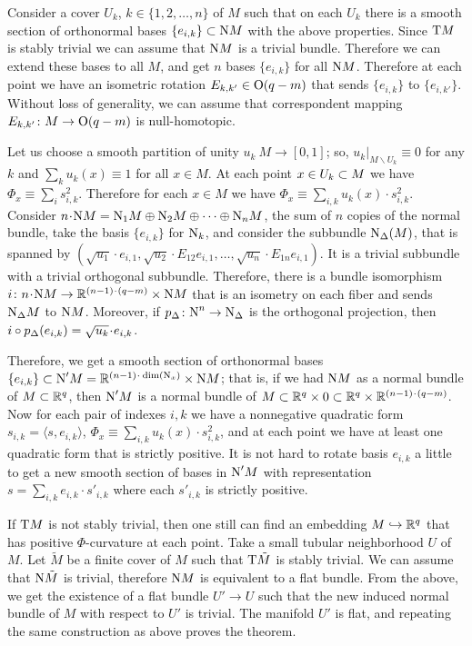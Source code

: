 \documentclass{article}
\begin{document}
Consider a cover $U_k$, $k\in \{1,2,\dots,n\}$
of $M$ such that on each $U_k$ there is a smooth section of
orthonormal bases $\{e_{i,k}\}\subset \text{\rm N} M$ with the above properties.
Since $\text{\rm T} M$ is stably trivial we can assume that $\text{\rm N} M$ is a trivial bundle.
Therefore we
can extend these bases to all $M$, and get $n$ bases
$\{e_{i,k}\}$ for all $\text{\rm N} M$.
Therefore at each point we have an isometric rotation $E_{k,k'}\in \text{\rm O}(q-m)$
that sends $\{e_{i,k}\}$ to $\{e_{i,k'}\}$.
Without loss of generality, we can assume that correspondent mapping
$E_{k,k'}\colon M\to \text{\rm O}(q-m)$ is null-homotopic.

Let us choose a smooth partition of unity $u_k\:M\to [0,1]$; so,
$u_k|_{M\backslash U_k}\equiv 0$  for any $k$ and
$\sum_k u_k(x)\equiv 1$ for all $x\in M$.
At each point $x\in U_k\subset M$ we have
$\Phi_x\equiv \sum_i s_{i,k}^2$.
Therefore for each $x\in M$ we have
$\Phi_x\equiv \sum_{i,k} u_k(x)\cdot  s_{i,k}^2$.
Consider $n\cdot\N M=\N_1 M\oplus \N_2 M\oplus \dots\oplus \N_n M$,
the sum of $n$ copies of the normal bundle,
take the basis $\{e_{i,k}\}$ for $\text{\rm N}_k$, and consider the subbundle $\text{\rm N}_\Delta(M)$,
that is spanned by
$(\sqrt{u_1} \cdot e_{i,1}, \sqrt{u_2} \cdot E_{12}e_{i,1},\dots, \sqrt{u_n} \cdot E_{1n}e_{i,1})$.
It is a trivial subbundle with a trivial orthogonal subbundle.
Therefore, there is a bundle isomorphism $i\:n\cdot \N M\z\to \RR^{(n-1)\cdot (q-m)}\times \N M$ that is an isometry on each fiber and sends
$\text{\rm N}_\Delta M$ to $\text{\rm N} M$.
Moreover, if $p_\Delta\colon\text{\rm N}^n\to \text{\rm N}_\Delta$ is the orthogonal projection, then $i\circ p_\Delta (e_{i,k})\z=\sqrt{u_k} \cdot e_{i,k}$.

Therefore, we get a smooth section of orthonormal bases
$\{e_{i,k}\}\i \N'M\z=\RR^{(n-1)\cdot \dim(\N_x)}\times \N  M$;
that is, if we had $\text{\rm N} M$ as a normal bundle of $M\subset \mathbb{R}^{q}$, then $\text{\rm N}'M$ is a
normal bundle of $M\i \RR^{q}\times 0\i \RR^{q}\times
\RR^{(n-1)\cdot (q-m)}$.
Now for each pair of indexes $i,k$ we have a nonnegative quadratic form $s_{i,k}= \langle s,e_{i,k}\rangle$, $\Phi_x\equiv \sum_{i,k} u_k(x)\cdot s_{i,k}^2$, and at each point we have at least one quadratic form that is strictly positive.
It is not hard to rotate basis $e_{i,k}$ a little to get a new smooth section of bases in $\text{\rm N}'M$ with representation $s= \sum_{i,k}e_{i,k}\cdot s'_{i,k}$ where each $s'_{i,k}$ is strictly positive.

If $\text{\rm T} M$ is not stably trivial, then one still can find an embedding $M\hookrightarrow \mathbb{R}^q$
that has positive $\Phi$-curvature at each point.
Take a small tubular neighborhood $U$ of $M$.
Let $\tilde M$ be a finite cover of $M$ such that $\text{\rm T} \tilde M$ is stably trivial.
 We can assume that $\text{\rm N}\tilde M$
is trivial, therefore $\text{\rm N} M$ is equivalent to a flat bundle.
From the above, we get the existence of a flat bundle $U'\to U$ such that the new induced normal bundle of $M$ with
respect to $U'$ is trivial.
The manifold $U'$ is flat, and repeating the same construction as above proves the theorem.
\qeds
\end{document}
